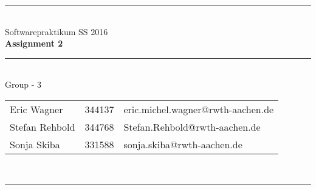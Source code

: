 \documentclass[a4paper,12pt]{article}
\begin{document}
\begin{center}
	\rule{\textwidth}{0.1pt}\\[1cm]
	
	\Large Softwarepraktikum SS 2016\\\bf Assignment 2
\end{center}


\begin{center}

	\rule{\textwidth}{0.1pt}\\[0.5cm]

	{\Large Group - 3\\[5mm]} 

	\begin{tabular}{lll}
		
		Eric Wagner & 344137 & eric.michel.wagner@rwth-aachen.de \\

		Stefan Rehbold & 344768 & Stefan.Rehbold@rwth-aachen.de \\

		Sonja Skiba & 331588 & sonja.skiba@rwth-aachen.de \\

	\end{tabular}\\[0.5cm]

	\rule{\textwidth}{0.1pt}\\[1cm]

\end{center}




\end{document}
